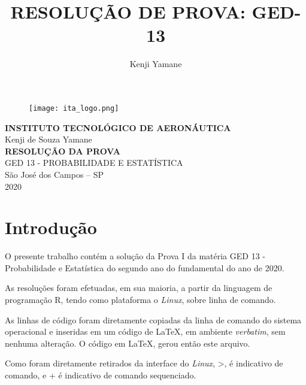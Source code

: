 \documentclass{article}[twocolumn]
\title{RESOLUÇÃO DE PROVA: GED-13}
\author{Kenji Yamane}
\begin{document}
	\begin{figure}[H]
		\centering
		\texttt{[image: ita\_logo.png]}
	\end{figure}
	\begin{center}
		\textbf{\normalsize{INSTITUTO TECNOLÓGICO DE AERONÁUTICA}}\\
		\vspace{2.5cm}
		\large{Kenji de Souza Yamane}\\
		\vspace{4.7cm}
		\textbf{RESOLUÇÃO DA PROVA}\\
		\large{GED 13 - PROBABILIDADE E ESTATÍSTICA}\\
		\vspace{4.7cm}
		\small{São José dos Campos – SP\\2020}
	\end{center}
	\newpage
	\tableofcontents
	\newpage
	\section{Introdução}
	O presente trabalho contém a solução da Prova I da matéria GED 13 - Probabilidade e
	Estatística do segundo ano do fundamental do ano de 2020.

	As resoluções foram efetuadas, em sua maioria, a partir da linguagem de programação R, tendo
	como plataforma o \textit{Linux}, sobre linha de comando.

	As linhas de código foram diretamente copiadas da linha de comando do sistema operacional
	e inseridas em um código de \LaTeX, em ambiente \textit{verbatim}, sem nenhuma alteração.
	O código em \LaTeX, gerou então este arquivo.
	
	Como foram diretamente retirados da interface do \textit{Linux}, \textgreater, é indicativo
	de comando, e + é indicativo de comando sequenciado.
	\newpage
\end{document}
